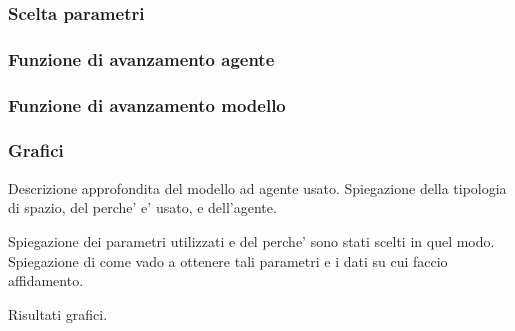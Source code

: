 \subsubsection*{Scelta parametri}

\subsubsection*{Funzione di avanzamento agente}

\subsubsection*{Funzione di avanzamento modello}

\subsubsection*{Grafici}

Descrizione approfondita del modello ad agente usato.
Spiegazione della tipologia di spazio, del perche' e' usato, e 
dell'agente. 

Spiegazione dei parametri utilizzati e del perche' sono stati 
scelti in quel modo. Spiegazione di come vado a ottenere tali parametri 
e i dati su cui faccio affidamento.

Risultati grafici.